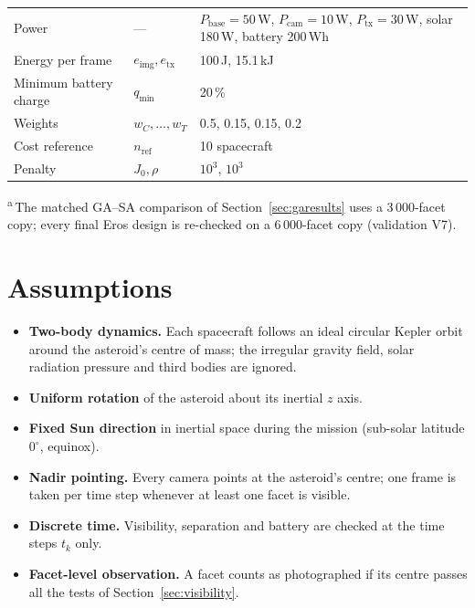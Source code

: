 \begin{table}[htbp]
\begin{tabularx}{\textwidth}{@{}Xp{1.6cm}p{3.3cm}p{3.3cm}@{}}
Power & --- & \multicolumn{2}{p{6.6cm}}{$P_{\mathrm{base}}=50$\,W, $P_{\mathrm{cam}}=10$\,W, $P_{\mathrm{tx}}=30$\,W, solar 180\,W, battery 200\,Wh} \\
Energy per frame & $e_{\mathrm{img}},e_{\mathrm{tx}}$ & \multicolumn{2}{p{6.6cm}}{100\,J, 15.1\,kJ} \\
Minimum battery charge & $q_{\min}$ & \multicolumn{2}{p{6.6cm}}{20\,\%} \\
Weights & $w_C,\dots,w_T$ & \multicolumn{2}{p{6.6cm}}{0.5, 0.15, 0.15, 0.2} \\
Cost reference & $n_{\mathrm{ref}}$ & \multicolumn{2}{p{6.6cm}}{10 spacecraft} \\
Penalty & $J_0,\rho$ & \multicolumn{2}{p{6.6cm}}{$10^3$, $10^3$} \\
\bottomrule
\end{tabularx}
\par\smallskip
\parbox{\textwidth}{\scriptsize \textsuperscript{a}\,The matched GA--SA comparison of
Section~\ref{sec:garesults} uses a 3\,000-facet copy; every final Eros design is re-checked on a
6\,000-facet copy (validation V7).}
\end{table}

\section{Assumptions}
\begin{itemize}
\item \textbf{Two-body dynamics.} Each spacecraft follows an ideal circular Kepler orbit around
the asteroid's centre of mass; the irregular gravity field, solar radiation pressure and
third bodies are ignored.
\item \textbf{Uniform rotation} of the asteroid about its inertial $z$ axis.
\item \textbf{Fixed Sun direction} in inertial space during the mission (sub-solar latitude
$0^\circ$, equinox).
\item \textbf{Nadir pointing.} Every camera points at the asteroid's centre; one frame is taken
per time step whenever at least one facet is visible.
\item \textbf{Discrete time.} Visibility, separation and battery are checked at the time steps
$t_k$ only.
\item \textbf{Facet-level observation.} A facet counts as photographed if its centre passes all
the tests of Section~\ref{sec:visibility}.
\end{itemize}

